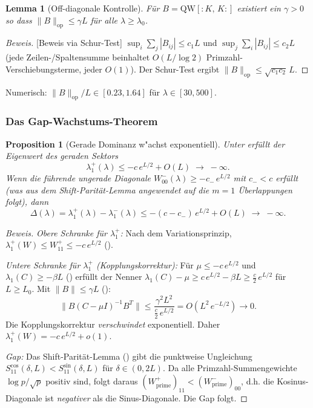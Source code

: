 \documentclass[12pt,a4paper]{article}
\newtheorem{lemma}[theorem]{Lemma}
\newtheorem{proposition}[theorem]{Proposition}
\theoremstyle{definition}
\theoremstyle{remark}
\begin{document}
\begin{lemma}[Off-diagonale Kontrolle]
\label{lem:L3}
Für $B = \mathrm{QW}[{:}K,\,K{:}]$ existiert ein $\gamma > 0$ so dass $\|B\|_{\mathrm{op}} \leq \gamma L$ für alle $\lambda \geq \lambda_0$.
\end{lemma}
\begin{proof}[Beweis][Beweis via Schur-Test]
$\sup_i \sum_j |B_{ij}| \leq c_1 L$ und $\sup_j \sum_i |B_{ij}| \leq c_2 L$ (jede Zeilen-/Spaltensumme beinhaltet $O(L/\log 2)$ Primzahl-Verschiebungsterme, jeder $O(1)$). Der Schur-Test ergibt $\|B\|_{\mathrm{op}} \leq \sqrt{c_1 c_2}\,L$.
\end{proof}

\noindent Numerisch: $\|B\|_{\mathrm{op}}/L \in [0.23, 1.64]$ für $\lambda \in [30, 500]$.

\subsubsection{Das Gap-Wachstums-Theorem}

\begin{proposition}[Gerade Dominanz w"achst exponentiell]
\label{prop:gap-growth}
Unter  erfüllt der Eigenwert des geraden Sektors
\[
  \lambda_1^+(\lambda) \leq -c\,e^{L/2} + O(L) \;\to\; -\infty.
\]
Wenn die führende ungerade Diagonale $W_{00}^-(\lambda) \geq -c_-\,e^{L/2}$ mit $c_- < c$ erfüllt (was aus dem Shift-Parität-Lemma angewendet auf die $m=1$ Überlappungen folgt), dann
\begin{equation}
\label{eq:gap-exp}
  \Delta(\lambda) = \lambda_1^+(\lambda) - \lambda_1^-(\lambda) \leq -(c - c_-)\,e^{L/2} + O(L) \;\to\; -\infty.
\end{equation}
\end{proposition}

\begin{proof}[Beweis]
\emph{Obere Schranke für $\lambda_1^+$:} Nach dem Variationsprinzip, $\lambda_1^+(W) \leq W_{11}^+ \leq -c\,e^{L/2}$ ().

\emph{Untere Schranke für $\lambda_1^+$ (Kopplungskorrektur):} Für $\mu \leq -c\,e^{L/2}$ und $\lambda_1(C) \geq -\beta L$ () erfüllt der Nenner $\lambda_1(C) - \mu \geq c\,e^{L/2} - \beta L \geq \tfrac{c}{2}\,e^{L/2}$ für $L \geq L_0$. Mit $\|B\| \leq \gamma L$ ():
\[
  \|B(C - \mu I)^{-1}B^T\| \leq \frac{\gamma^2 L^2}{\frac{c}{2}\,e^{L/2}} = O(L^2\,e^{-L/2}) \to 0.
\]
Die Kopplungskorrektur \emph{verschwindet} exponentiell. Daher $\lambda_1^+(W) = -c\,e^{L/2} + o(1)$.

\emph{Gap:} Das Shift-Parität-Lemma () gibt die punktweise Ungleichung $S_{11}^{\cos}(\delta, L) < S_{11}^{\sin}(\delta, L)$ für $\delta \in (0, 2L)$. Da alle Primzahl-Summengewichte $\log p / \sqrt{p}$ positiv sind, folgt daraus $(W_{\mathrm{prime}}^+)_{11} < (W_{\mathrm{prime}}^-)_{00}$, d.h. die Kosinus-Diagonale ist \emph{negativer} als die Sinus-Diagonale. Die Gap folgt.
\end{proof}
\end{document}
